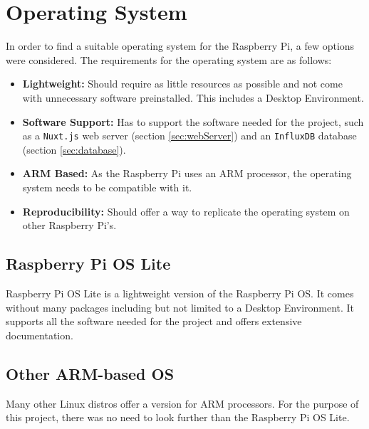 \section{Operating System}
In order to find a suitable operating system for the Raspberry Pi, a few options
were considered. The requirements for the operating system are as follows:
\begin{itemize}
    \item \textbf{Lightweight:} Should require as little resources as possible
    and not come with unnecessary software preinstalled. This includes a Desktop 
    Environment.
    \item \textbf{Software Support:} Has to support the software needed for the
    project, such as a \texttt{Nuxt.js} web server (section \ref{sec:webServer})
    and an \texttt{InfluxDB} database (section \ref{sec:database}).
    \item \textbf{ARM Based:} As the Raspberry Pi uses an ARM processor, the
    operating system needs to be compatible with it.
    \item \textbf{Reproducibility:} Should offer a way to replicate the operating
    system on other Raspberry Pi's.
\end{itemize}
    \subsection{Raspberry Pi OS Lite}
    Raspberry Pi OS Lite is a lightweight version of the Raspberry Pi OS. It
    comes without many packages including but not limited to a Desktop Environment.
    It supports all the software needed for the project and offers extensive documentation.
    \subsection{Other ARM-based OS}
    Many other Linux distros offer a version for ARM processors. For the purpose of
    this project, there was no need to look further than the Raspberry Pi OS Lite.